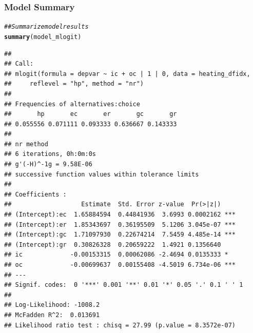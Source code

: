 \documentclass{beamer}\usepackage[]{graphicx}\usepackage[]{color}
\makeatletter
\newcommand{\hlcom}[1]{\textcolor[rgb]{0.678,0.584,0.686}{\textit{#1}}}%
\newcommand{\hlstd}[1]{\textcolor[rgb]{0.345,0.345,0.345}{#1}}%
\newcommand{\hlkwd}[1]{\textcolor[rgb]{0.737,0.353,0.396}{\textbf{#1}}}%
\newenvironment{kframe}{%
 \def\at@end@of@kframe{}%
 \ifinner\ifhmode%
  \def\at@end@of@kframe{\end{minipage}}%
  \begin{minipage}{\columnwidth}%
 \fi\fi%
 \def\FrameCommand##1{\hskip\@totalleftmargin \hskip-\fboxsep
 \colorbox{shadecolor}{##1}\hskip-\fboxsep
     \hskip-\linewidth \hskip-\@totalleftmargin \hskip\columnwidth}%
 \MakeFramed {\advance\hsize-\width
   \@totalleftmargin\z@ \linewidth\hsize
   \@setminipage}}%
 {\par\unskip\endMakeFramed%
 \at@end@of@kframe}
\newenvironment{knitrout}{}{} %
\makeatother
\begin{document}
\begin{frame}[fragile]\frametitle{Model Summary}
\begin{knitrout}\tiny
{}\color{fgcolor}\begin{kframe}
\begin{alltt}
\hlcom{## Summarize model results}
\hlkwd{summary}\hlstd{(model_mlogit)}
\end{alltt}
\begin{verbatim}
## 
## Call:
## mlogit(formula = depvar ~ ic + oc | 1 | 0, data = heating_dfidx, 
##     reflevel = "hp", method = "nr")
## 
## Frequencies of alternatives:choice
##       hp       ec       er       gc       gr 
## 0.055556 0.071111 0.093333 0.636667 0.143333 
## 
## nr method
## 6 iterations, 0h:0m:0s 
## g'(-H)^-1g = 9.58E-06 
## successive function values within tolerance limits 
## 
## Coefficients :
##                   Estimate  Std. Error z-value  Pr(>|z|)    
## (Intercept):ec  1.65884594  0.44841936  3.6993 0.0002162 ***
## (Intercept):er  1.85343697  0.36195509  5.1206 3.045e-07 ***
## (Intercept):gc  1.71097930  0.22674214  7.5459 4.485e-14 ***
## (Intercept):gr  0.30826328  0.20659222  1.4921 0.1356640    
## ic             -0.00153315  0.00062086 -2.4694 0.0135333 *  
## oc             -0.00699637  0.00155408 -4.5019 6.734e-06 ***
## ---
## Signif. codes:  0 '***' 0.001 '**' 0.01 '*' 0.05 '.' 0.1 ' ' 1
## 
## Log-Likelihood: -1008.2
## McFadden R^2:  0.013691 
## Likelihood ratio test : chisq = 27.99 (p.value = 8.3572e-07)
\end{verbatim}
\end{kframe}
\end{knitrout}
\end{frame}
\end{document}
